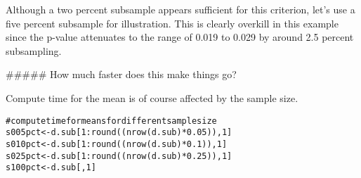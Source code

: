 \documentclass{article}\usepackage[]{graphicx}\usepackage[]{color}
\makeatletter
\newcommand{\hlnum}[1]{\textcolor[rgb]{0.863,0.196,0.184}{#1}}%
\newcommand{\hlcom}[1]{\textcolor[rgb]{0.345,0.431,0.459}{#1}}%
\newcommand{\hlopt}[1]{\textcolor[rgb]{0.576,0.631,0.631}{#1}}%
\newcommand{\hlstd}[1]{\textcolor[rgb]{0.514,0.58,0.588}{#1}}%
\newcommand{\hlkwb}[1]{\textcolor[rgb]{0.522,0.6,0}{#1}}%
\newcommand{\hlkwd}[1]{\textcolor[rgb]{0.576,0.631,0.631}{#1}}%
\newenvironment{kframe}{%
 \def\at@end@of@kframe{}%
 \ifinner\ifhmode%
  \def\at@end@of@kframe{\end{minipage}}%
  \begin{minipage}{\columnwidth}%
 \fi\fi%
 \def\FrameCommand##1{\hskip\@totalleftmargin \hskip-\fboxsep
 \colorbox{shadecolor}{##1}\hskip-\fboxsep
     \hskip-\linewidth \hskip-\@totalleftmargin \hskip\columnwidth}%
 \MakeFramed {\advance\hsize-\width
   \@totalleftmargin\z@ \linewidth\hsize
   \@setminipage}}%
 {\par\unskip\endMakeFramed%
 \at@end@of@kframe}
\newenvironment{knitrout}{}{} %
\makeatother
\begin{document}
Although a two percent subsample appears sufficient for this criterion, let’s use a five percent subsample for illustration.
This is clearly overkill in this example since the p-value attenuates to the range of 0.019 to 0.029 by around 2.5 percent subsampling.

##### How much faster does this make things go?

Compute time for the mean is of course affected by the sample size.

\begin{knitrout}
\color{fgcolor}\begin{kframe}
\begin{alltt}
\hlcom{# compute time for means for different sample size}
\hlstd{s005pct} \hlkwb{<-} \hlstd{d.sub[}\hlnum{1}\hlopt{:}\hlkwd{round}\hlstd{((}\hlkwd{nrow}\hlstd{(d.sub)} \hlopt{*} \hlnum{0.05}\hlstd{)),} \hlnum{1}\hlstd{]}
\hlstd{s010pct} \hlkwb{<-} \hlstd{d.sub[}\hlnum{1}\hlopt{:}\hlkwd{round}\hlstd{((}\hlkwd{nrow}\hlstd{(d.sub)} \hlopt{*} \hlnum{0.1}\hlstd{)),} \hlnum{1}\hlstd{]}
\hlstd{s025pct} \hlkwb{<-} \hlstd{d.sub[}\hlnum{1}\hlopt{:}\hlkwd{round}\hlstd{((}\hlkwd{nrow}\hlstd{(d.sub)} \hlopt{*} \hlnum{0.25}\hlstd{)),} \hlnum{1}\hlstd{]}
\hlstd{s100pct} \hlkwb{<-} \hlstd{d.sub[,} \hlnum{1}\hlstd{]}
\end{alltt}
\end{kframe}
\end{knitrout}
\end{document}
